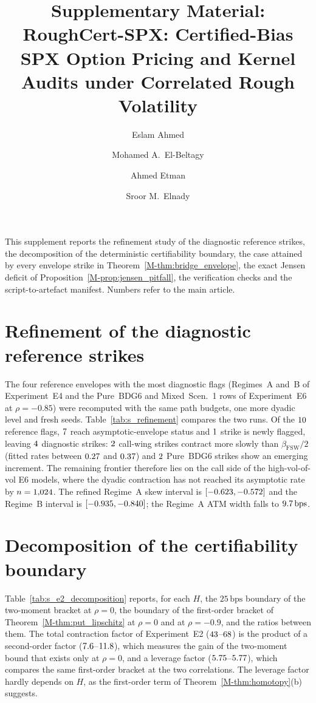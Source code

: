 \documentclass[11pt,a4paper]{article}
\title{\bfseries Supplementary Material:\\ RoughCert-SPX: Certified-Bias SPX Option Pricing and Kernel Audits under Correlated Rough Volatility}
\author{Eslam Ahmed \and Mohamed A.\ El-Beltagy \and Ahmed Etman \and Sroor M.\ Elnady}
\date{}
\newcommand{\mref}[1]{\ref*{M-#1}}
\newcommand{\bps}{\ensuremath{\,\mathrm{bps}}}
\begin{document}
\maketitle

\noindent This supplement reports the refinement study of the diagnostic reference strikes, the decomposition of the deterministic certifiability boundary, the case attained by every envelope strike in Theorem~\mref{thm:bridge_envelope}, the exact Jensen deficit of Proposition~\mref{prop:jensen_pitfall}, the verification checks and the script-to-artefact manifest. Numbers refer to the main article.
\renewcommand{\thesection}{S\arabic{section}}
\renewcommand{\thetable}{S\arabic{table}}
\renewcommand{\thefigure}{S\arabic{figure}}

\section{Refinement of the diagnostic reference strikes}
\label{sec:s_refinement}
The four reference envelopes with the most diagnostic flags (Regimes~A and~B of Experiment~E4 and the Pure~BDG6 and Mixed~Scen.~1 rows of Experiment~E6 at $\rho=-0.85$) were recomputed with the same path budgets, one more dyadic level and fresh seeds. Table~\ref{tab:s_refinement} compares the two runs. Of the $10$ reference flags, $7$ reach asymptotic-envelope status and $1$ strike is newly flagged, leaving $4$ diagnostic strikes: $2$ call-wing strikes contract more slowly than $\beta_{\mathrm{FSW}}/2$ (fitted rates between $0.27$ and $0.37$) and $2$ Pure~BDG6 strikes show an emerging increment. The remaining frontier therefore lies on the call side of the high-vol-of-vol E6 models, where the dyadic contraction has not reached its asymptotic rate by $n=1{,}024$. The refined Regime~A skew interval is $[-0.623,-0.572]$ and the Regime~B interval is $[-0.935,-0.840]$; the Regime~A ATM width falls to $\RefAATMWidthVTwo\bps$.
%
\FloatBarrier

\section{Decomposition of the certifiability boundary}
\label{sec:s_decomposition}
Table~\ref{tab:s_e2_decomposition} reports, for each $H$, the $25\bps$ boundary of the two-moment bracket at $\rho=0$, the boundary of the first-order bracket of Theorem~\mref{thm:put_lipschitz} at $\rho=0$ and at $\rho=-0.9$, and the ratios between them. The total contraction factor of Experiment~E2 ($43$--$68$) is the product of a second-order factor ($7.6$--$11.8$), which measures the gain of the two-moment bound that exists only at $\rho=0$, and a leverage factor ($5.75$--$5.77$), which compares the same first-order bracket at the two correlations. The leverage factor hardly depends on $H$, as the first-order term of Theorem~\mref{thm:homotopy}(b) suggests.
%
\FloatBarrier
\end{document}
